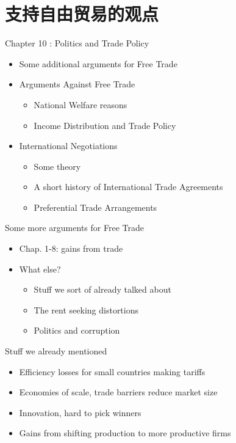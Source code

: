 \documentclass[10pt,hyperref={CJKbookmarks=true},xcolor=dvipsnames,aspectratio=169]{beamer}
\begin{document}
\section{支持自由贸易的观点}
\begin{frame}{Chapter 10 : Politics and Trade Policy}

\begin{itemize}
	\item Some additional arguments for Free Trade
	\item Arguments Against Free Trade
	\begin{itemize}
		\item National Welfare reasons 
		\item Income Distribution and Trade Policy
	\end{itemize}
	\item International Negotiations
	\begin{itemize}
		\item Some theory
		\item A short history of International Trade Agreements 
		\item Preferential Trade Arrangements
	\end{itemize}
\end{itemize}

\end{frame}

\begin{frame}{Some more arguments for Free Trade}

\begin{itemize}
\item Chap. 1-8: gains from trade
\item What else?
\begin{itemize}
	\item Stuff we sort of already talked about
	\item The rent seeking distortions
	\item Politics and corruption
\end{itemize}
\end{itemize}

\end{frame}

\begin{frame}{Stuff we already mentioned}

\begin{itemize}
\item Efficiency losses for small countries making tariffs
\item Economies of scale, trade barriers reduce market size 
\item Innovation, hard to pick winners
\item Gains from shifting production to more productive firms
\end{itemize}

\end{frame}
\end{document}
